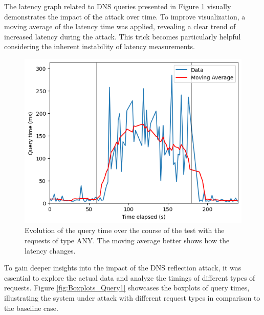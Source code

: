 The latency graph related to DNS queries presented in Figure \ref{fig:Query_MA_ANY1} visually demonstrates the impact of the attack over time. To improve visualization, a moving average of the latency time was applied, revealing a clear trend of increased latency during the attack. This trick becomes particularly helpful considering the inherent instability of latency measurements.
\begin{figure}[H]
    \centering
    \includegraphics[width=\columnwidth]{Sections/Images/Query_MA_ANY.png}
    \caption{Evolution of the query time over the course of the test with the requests of type ANY. The moving average better shows how the latency changes.}
    \label{fig:Query_MA_ANY1}
\end{figure}
\noindent To gain deeper insights into the impact of the DNS reflection attack, it was essential to explore the actual data and analyze the timings of different types of requests. Figure \ref{fig:Boxplots_Query1} showcases the boxplots of query times, illustrating the system under attack with different request types in comparison to the baseline case. \\
